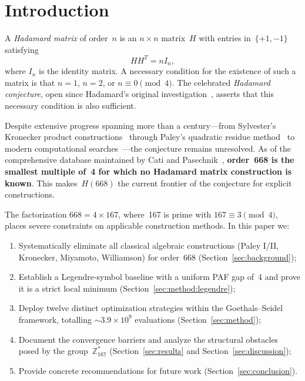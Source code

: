 \documentclass[11pt,a4paper]{article}
\newcommand{\ZZ}{\mathbb{Z}}
\begin{document}
\section{Introduction}\label{sec:intro}

A \emph{Hadamard matrix} of order~$n$ is an $n \times n$ matrix~$H$ with
entries in~$\{+1,-1\}$ satisfying
\begin{equation}\label{eq:hadamard}
  HH^T = nI_n,
\end{equation}
where $I_n$ is the identity matrix.  A necessary condition for the
existence of such a matrix is that $n = 1$, $n = 2$, or $n \equiv 0
\pmod{4}$.  The celebrated \emph{Hadamard conjecture}, open since
Hadamard's original investigation~\cite{hadamard1893resolution}, asserts
that this necessary condition is also sufficient.

Despite extensive progress spanning more than a century---from Sylvester's
Kronecker product constructions~\cite{sylvester1867thoughts} through
Paley's quadratic residue method~\cite{paley1933orthogonal} to modern
computational searches~\cite{djokovic2018goethals,bright2019sat}---the
conjecture remains unresolved.  As of the comprehensive
database maintained by Cati and Pasechnik~\cite{cati2024hadamard,cati2023implementing},
\textbf{order~668 is the smallest multiple of~4 for which no Hadamard
matrix construction is known}.  This makes~$H(668)$ the current frontier of
the conjecture for explicit constructions.

The factorization $668 = 4 \times 167$, where~167 is prime with $167
\equiv 3 \pmod{4}$, places severe constraints on applicable construction
methods.  In this paper we:
\begin{enumerate}
  \item Systematically eliminate all classical algebraic constructions
    (Paley I/II, Kronecker, Miyamoto, Williamson) for order~668
    (Section~\ref{sec:background});
  \item Establish a Legendre-symbol baseline with a uniform PAF gap of~4
    and prove it is a strict local minimum
    (Section~\ref{sec:method:legendre});
  \item Deploy twelve distinct optimization strategies within the
    Goethals--Seidel framework, totalling $\sim\!3.9 \times 10^9$
    evaluations (Section~\ref{sec:method});
  \item Document the convergence barriers and analyze the structural
    obstacles posed by the group~$\ZZ_{167}^*$
    (Section~\ref{sec:results} and Section~\ref{sec:discussion});
  \item Provide concrete recommendations for future work
    (Section~\ref{sec:conclusion}).
\end{enumerate}
\end{document}
